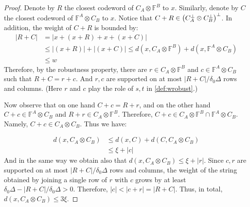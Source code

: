  \begin{proof}
Denote by $R$ the closest codeword of $C_{A}\otimes\mathbb{F}^{B}$ to $x$. Similarly, denote by $C$ the closest codeword of $\mathbb{F}^{A} \otimes C_{B}$ to $x$. Notice that $C + R \in \left( C_{A}^{\perp}\otimes C_{B}^{\perp} \right)^{\perp}$. In addition, the weight of $C+R$ is bounded by:
   \begin{equation*}
     \begin{split}
       |R + C| &=  |x + \left(x + R\right) + x + \left( x + C\right)| \\
       & \le |\left(x + R\right)|+ |\left( x + C\right)| \le d\left( x ,   C_{A}\otimes\mathbb{F}^{B} \right) +  d\left( x ,   \mathbb{F}^{A} \otimes C_{B} \right) \\ 
       & \le w
     \end{split}
   \end{equation*}
   Therefore, by the robustness property, there are $r \in C_{A}\otimes\mathbb{F}^{B}$ and $c \in \mathbb{F}^{A} \otimes C_{B} $ such that $ R + C  = r + c$. And $r,c$ are supported on at most $|R+C|/\delta_{0}\Delta$ rows and columns. (Here $r$ and $c$ play the role of $s,t$ in \cref{def:wrobust}.)  

   Now observe that on one hand $C + c = R + r$, and on the other hand $ C + c \in \mathbb{F}^{A} \otimes C_{B} $ and $R+r \in C_{A}\otimes\mathbb{F}^{B}$. Therefore, $C+c \in C_{A}\otimes\mathbb{F}^{B} \cap \mathbb{F}^{A} \otimes C_{B}$. Namely, $C +c \in C_{A} \otimes C_{B}$. Thus we have:  
   
   \begin{equation*}
     \begin{split}
       d\left(x, C_{A}\otimes C_{B}\right) & \le d\left(x, C\right) + d\left(C, C_{A}\otimes C_{B} \right) \\
       &\le \xi + |c|
     \end{split}
   \end{equation*}
   And in the same way we obtain also that $d\left( x, C_{A} \otimes C_{B} \right) \le \xi + |r|$. Since $c,r$ are supported on at most $|R+C|/\delta_{0}\Delta$ rows and columns, the weight of the string obtained by joining a single row of $r$ with $c$ grows by at least $\delta_{0}\Delta - |R+C|/\delta_{0}\Delta > 0$. Therefore, $|c| < |c + r| = |R + C|$. Thus, in total, $d\left( x, C_{A} \otimes C_{B} \right) \le 3\xi$.
 \end{proof}

